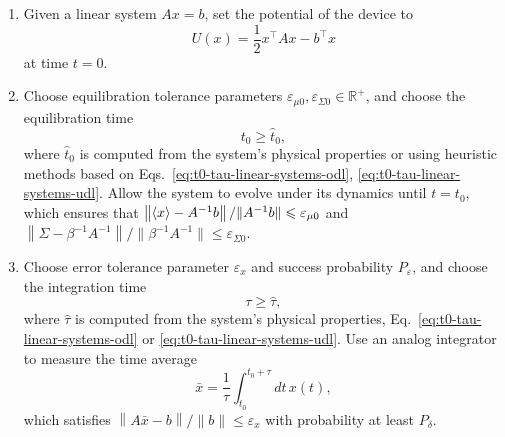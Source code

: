 \documentclass[prx,onecolumn,floatfix,longbibliography,notitlepage, nofootinbib]{revtex4-1}
\renewcommand{\geq}{\geqslant}
\renewcommand{\leq}{\leqslant}
\begin{document}
\medskip
\begin{tcolorbox}[title={Linear System Protocol}, breakable]
\begin{enumerate}
\item Given a linear system $A x = b$, set the potential of the device to
\begin{equation}
    U(x) = \frac{1}{2} x^\intercal A x - b^\intercal x
\end{equation}
at time $t=0$.
\item Choose equilibration tolerance parameters $\varepsilon_{\mu0}, \varepsilon_{\Sigma 0} \in \mathbb{R}^+$, and choose the equilibration time
\begin{equation}
\label{eq:UDL-eq-time}
t_0 \geq \widehat{t}_0,
\end{equation}
where $\widehat{t}_0$ is computed from the system's physical properties or using heuristic methods based on Eqs.~\eqref{eq:t0-tau-linear-systems-odl}, \eqref{eq:t0-tau-linear-systems-udl}. Allow the system to evolve under its dynamics until $t=t_0$, which ensures that $\left\|\braket{x} - A^{-1} b\right\|/\|A^{-1} b\| \leq \varepsilon_{\mu 0}$ and $\left\|\Sigma - \beta^{-1} A^{-1} \right\|/\|\beta^{-1}A^{-1}\| \leq \varepsilon_{\Sigma0}$.
\item Choose error tolerance parameter $\varepsilon_x$ and success probability $P_\varepsilon$, and choose the integration time
\begin{equation}
    \tau \geq \widehat{\tau},
\end{equation}
where $\widehat{\tau}$ is computed from the system's physical properties, Eq.~\eqref{eq:t0-tau-linear-systems-odl} or \eqref{eq:t0-tau-linear-systems-udl}. Use an analog integrator to measure the time average
\begin{equation}
    \bar{x} = \frac{1}{\tau} \int_{t_0}^{t_0 + \tau} dt\, x(t),
\end{equation}
which satisfies $\left\|A \bar{x} - b\right\|/\|b\| \leq \varepsilon_x$ with probability at least $P_\delta$.
\end{enumerate}
\end{tcolorbox}
\medskip
\end{document}
